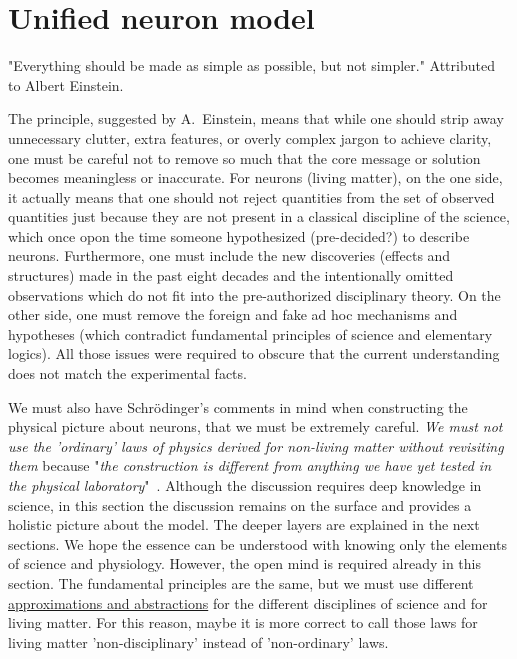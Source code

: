 
\section[Unified model]{Unified neuron model\label{sec:Physics-Unified}}

\quotationbox
{
"Everything should be made as simple as possible, but not simpler." Attributed to Albert Einstein.\\
}

The principle, suggested by A.~Einstein, means that while one should strip away unnecessary clutter, extra features, or overly complex jargon to achieve clarity, one must be careful not to remove so much that the core message or solution becomes meaningless or inaccurate.
For neurons (living matter), on the one side, it actually means that one should not reject quantities from the set of observed quantities
just because they are not present in a classical discipline of the 
science, which once opon the time someone hypothesized (pre-decided?)
to describe neurons. Furthermore, one must include the new discoveries (effects and structures) made in the past eight decades and the
intentionally omitted
observations which do not fit into the pre-authorized disciplinary theory.
On the other side, one must remove the foreign and fake ad hoc mechanisms and hypotheses (which contradict fundamental principles of science and elementary logics). 
All those issues were required to obscure that the current understanding does not match the experimental facts.



We must also have Schrödinger's comments in mind when constructing the \hypertarget{PhysicalPictureNeuron}{physical picture
about neurons}, that we must be extremely careful. \textit{We must not use the
'ordinary' laws of physics derived for non-living matter without revisiting them} because "\textit{the construction is different from anything we have yet tested in the physical laboratory}"~\cite{Schrodinger:1992}.
Although the discussion requires deep knowledge in science,
in this section the discussion remains on the surface and provides a holistic picture about the model.
The deeper layers are explained in the next sections. 
We hope the essence can be understood with knowing only
the elements of science and physiology. However, the open mind is required
already in this section.
The fundamental principles are the same, but we must use different 
\hyperlink{Abstractions}{approximations
 and abstractions} for the different disciplines of science and for living matter. For this reason,
maybe it is more correct to call those laws for living matter 'non-disciplinary'
instead of 'non-ordinary' laws.

